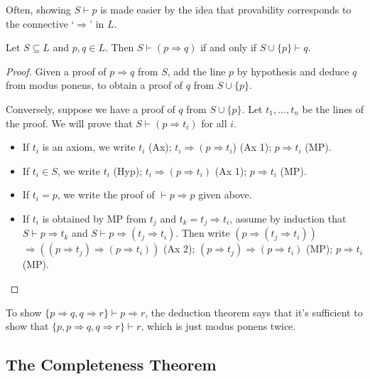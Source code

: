\documentclass[a3paper, 10pt]{article}
\begin{document}
\begin{multicols*}{5}
Often, showing $S \vdash p$ is made easier by the idea that provability corresponds to the connective `$\Rightarrow$' in $L$. 

\begin{theorem}
  Let $S \subseteq L$ and $p, q \in L$. Then $S \vdash (p \Rightarrow q)$ if and only if $S \cup \{p\} \vdash q$. 
\end{theorem}
\begin{proof}
Given a proof of $p \Rightarrow q$ from $S$, add the line $p$ by hypothesis and deduce $q$ from modus ponens, to obtain a proof of $q$ from $S \cup\{p\}$.

Conversely, suppose we have a proof of $q$ from $S \cup\{p\}$. Let $t_1, \ldots, t_n$ be the lines of the proof. We will prove that $S \vdash\left(p \Rightarrow t_i\right)$ for all $i$.
\begin{itemize}
  \item If $t_i$ is an axiom, we write $t_i$ (Ax); $t_i \Rightarrow\left(p \Rightarrow t_i\right.$) (Ax 1); $p \Rightarrow t_i$ (MP).
  \item If $t_i \in S$, we write $t_i$ (Hyp); $t_i \Rightarrow\left(p \Rightarrow t_i\right)$ (Ax 1); $p \Rightarrow t_i$ (MP).
  \item If $t_i=p$, we write the proof of $\vdash p \Rightarrow p$ given above.
  \item If $t_i$ is obtained by MP from $t_j$ and $t_k = t_j \Rightarrow t_i$, 
  assume by induction that $S \vdash p \Rightarrow t_k$ and $S \vdash p \Rightarrow\left(t_j \Rightarrow t_i\right)$. Then write $\left(p \Rightarrow\left(t_j \Rightarrow t_i\right)\right) $ $\Rightarrow\left(\left(p \Rightarrow t_j\right) \Rightarrow\left(p \Rightarrow t_i\right)\right)$ (Ax 2); $\left(p \Rightarrow t_j\right) \Rightarrow\left(p \Rightarrow t_i\right)$ (MP); $p \Rightarrow t_i$ (MP).
\end{itemize}\vspace{-1pc}
\end{proof}

\begin{example}
  To show $\{p \Rightarrow q, q \Rightarrow r\} \vdash p \Rightarrow r$, the deduction theorem says that it's sufficient to show that $\{p, p\Rightarrow q, q \Rightarrow r\} \vdash r$, which is just modus ponens twice.
\end{example}

\subsection{The Completeness Theorem}


\end{multicols*}
\end{document}
